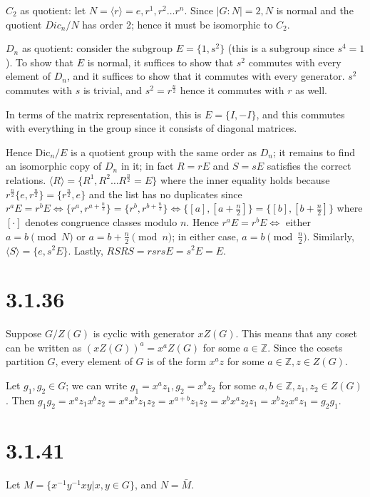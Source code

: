 \documentclass{article}
\def\Z{\mathbb{Z}}
\def\<{\langle}
\def\>{\rangle}
\def\inv{{-1}}
\def\Dic{\textrm{Dic}}
\begin{document}
$C_2$ as quotient: let $N = \<r\> = e, r^1, r^2 \ldots r^n$. Since $|G:N|=2, N$ is normal and the quotient $Dic_n / N$ has order 2; hence it must be isomorphic to $C_2$.

$D_n$ as quotient: consider the subgroup $E = \{1, s^2\}$ (this is a subgroup since $s^4 = 1$). To show that $E$ is normal, it suffices to show that $s^2$ commutes with every element of $D_n$, and it suffices to show that it commutes with every generator. $s^2$ commutes with $s$ is trivial, and $s^2 = r^\frac{n}{2}$ hence it commutes with $r$ as well.

In terms of the matrix representation, this is $E = \{I, -I\}$, and this commutes with everything in the group since it consists of diagonal matrices.

Hence $\Dic_n / E$ is a quotient group with the same order as $D_n$; it remains to find an isomorphic copy of $D_n$ in it; in fact $R = rE$ and $S = sE$ satisfies the correct relations. $\<R\> = \{ R^1, R^2 \ldots R^\frac{n}{2} = E\}$ where the inner equality holds because $r^\frac{n}{2} \{e, r^\frac{n}{2}\} = \{r^\frac{n}{2}, e\}$ and the list has no duplicates since $r^a E = r^b E \iff \{r^a, r^{a + \frac{n}{2}}\} = \{r^b, r^{b + \frac{n}{2}}\} \iff \{[a], [a+\frac{n}{2}]\} = \{[b], [b+\frac{n}{2}]\}$ where $[\cdot]$ denotes congruence classes modulo $n$. Hence $r^a E = r^b E \iff$ either $a = b \pmod N$ or $a = b + \frac{n}{2} \pmod n$; in either case, $a = b \pmod{\frac{n}{2}}$. Similarly, $\<S\> = \{e, s^2 E\}$. Lastly, $RSRS = rsrs E = s^2E = E$.

\section*{3.1.36}

Suppose $G / Z(G)$ is cyclic with generator $xZ(G)$. This means that any coset can be written as $(xZ(G))^a = x^a Z(G)$ for some $a \in \Z$. Since the cosets partition $G$, every element of $G$ is of the form $x^a z$ for some $a \in \Z, z \in Z(G)$. 

Let $g_1, g_2 \in G$; we can write $g_1 = x^a z_1, g_2 = x^b z_2$ for some $a, b \in \Z, z_1, z_2 \in Z(G)$. Then $g_1 g_2 = x^a z_1 x^b z_2 = x^a x^b z_1 z_2 = x^{a+b} z_1 z_2 = x^b x^a z_2 z_1 = x^b z_2 x^a z_1 = g_2 g_1$. 

\section*{3.1.41}

Let $M = \{x^\inv y^\inv x y | x, y \in G\}$, and $N = \bar{M}$.
\end{document}
